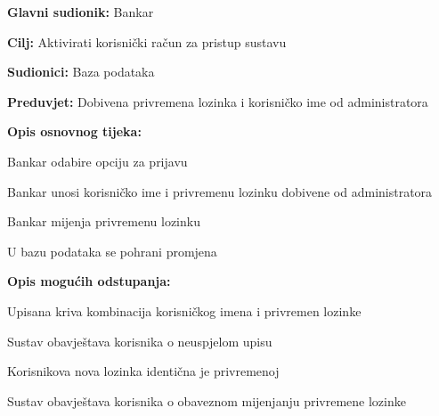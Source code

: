 			
			\noindent {}
			\begin{packed_item}
				
				\item \textbf{Glavni sudionik: }Bankar
				\item  \textbf{Cilj:} Aktivirati korisnički račun za pristup sustavu
				\item  \textbf{Sudionici:} Baza podataka
				\item  \textbf{Preduvjet:} Dobivena privremena lozinka i korisničko ime od administratora
				\item  \textbf{Opis osnovnog tijeka:}
				
				\item[] \begin{packed_enum}
					
					\item  Bankar odabire opciju za prijavu
					\item  Bankar unosi korisničko ime i privremenu lozinku dobivene od administratora
					\item  Bankar mijenja privremenu lozinku 
					\item  U bazu podataka se pohrani promjena 
				\end{packed_enum}
				
				\item  \textbf{Opis mogućih odstupanja:}
				
				\item[] \begin{packed_enum}
					
					\item[2.a] Upisana kriva kombinacija korisničkog imena i privremen lozinke
					\item[] \begin{packed_enum}
						
						\item Sustav obavještava korisnika o neuspjelom upisu 
						
					\end{packed_enum}
					
					\item[3.a] Korisnikova nova lozinka identična je privremenoj
					\item[] \begin{packed_enum}
						
						\item Sustav obavještava korisnika o obaveznom mijenjanju privremene lozinke
						
						
						\end{packed_enum}
					\end{packed_enum}
			\end{packed_item}
		
